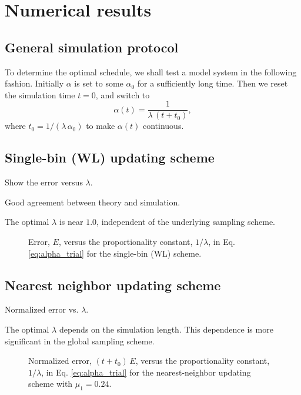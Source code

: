 \documentclass[reprint]{revtex4-1}
\begin{document}
\section{\label{sec:results}
Numerical results}


\subsection{General simulation protocol}


To determine the optimal schedule,
we shall test a model system
in the following fashion.
%
Initially $\alpha$ is set to some $\alpha_0$
for a sufficiently long time.
%
Then we reset the simulation time $t = 0$,
and switch to
$$
\alpha(t) = \frac{ 1 } { \lambda \, (t + t_0) },
$$
where $t_0 = 1/(\lambda \, \alpha_0)$
to make $\alpha(t)$ continuous.


\subsection{Single-bin (WL) updating scheme}

Show the error versus $\lambda$.

Good agreement between theory and simulation.

The optimal $\lambda$ is near $1.0$,
independent of the underlying sampling scheme.



\begin{figure}[h]
\begin{center}
  \caption{
    \label{fig:err_singlebin}
    Error, $E$, versus the proportionality constant, $1/\lambda$,
    in Eq. \eqref{eq:alpha_trial}
    for the single-bin (WL) scheme.
  }
\end{center}
\end{figure}



\subsection{Nearest neighbor updating scheme}

Normalized error vs. $\lambda$.

The optimal $\lambda$ depends on the simulation length.
This dependence is more significant in the global sampling scheme.


\begin{figure}[h]
\begin{center}
  \caption{
    \label{fig:err_nnbr}
    Normalized error, $(t + t_0) \, E$,
    versus the proportionality constant, $1/\lambda$,
    in Eq. \eqref{eq:alpha_trial}
    for the nearest-neighbor updating scheme with $\mu_1 = 0.24$.
  }
\end{center}
\end{figure}
\end{document}
